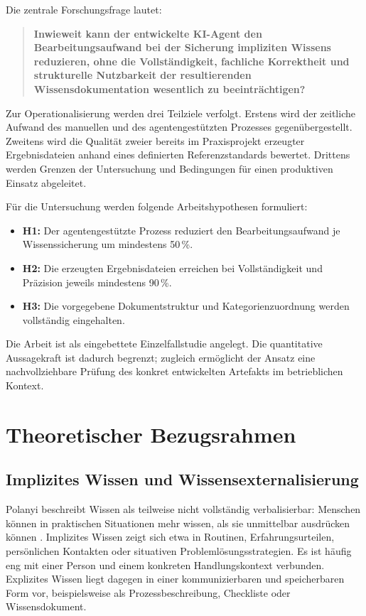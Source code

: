 \documentclass[
  10pt,
  ngerman,
  a4paper,
  toc=graduated,
  numbers=noenddot,
  headings=standardclasses,
  nonumberlist
]{scrartcl}
\newcommand{\pct}[1]{#1\,\%}
\begin{document}
Die zentrale Forschungsfrage lautet:

\begin{quote}
\textbf{Inwieweit kann der entwickelte KI-Agent den Bearbeitungsaufwand bei der Sicherung impliziten Wissens reduzieren, ohne die Vollständigkeit, fachliche Korrektheit und strukturelle Nutzbarkeit der resultierenden Wissensdokumentation wesentlich zu beeinträchtigen?}
\end{quote}

Zur Operationalisierung werden drei Teilziele verfolgt. Erstens wird der zeitliche Aufwand des manuellen und des agentengestützten Prozesses gegenübergestellt. Zweitens wird die Qualität zweier bereits im Praxisprojekt erzeugter Ergebnisdateien anhand eines definierten Referenzstandards bewertet. Drittens werden Grenzen der Untersuchung und Bedingungen für einen produktiven Einsatz abgeleitet.

Für die Untersuchung werden folgende Arbeitshypothesen formuliert:

\begin{itemize}
\item \textbf{H1:} Der agentengestützte Prozess reduziert den Bearbeitungsaufwand je Wissenssicherung um mindestens \pct{50}.
\item \textbf{H2:} Die erzeugten Ergebnisdateien erreichen bei Vollständigkeit und Präzision jeweils mindestens \pct{90}.
\item \textbf{H3:} Die vorgegebene Dokumentstruktur und Kategorienzuordnung werden vollständig eingehalten.
\end{itemize}

Die Arbeit ist als eingebettete Einzelfallstudie angelegt. Die quantitative Aussagekraft ist dadurch begrenzt; zugleich ermöglicht der Ansatz eine nachvollziehbare Prüfung des konkret entwickelten Artefakts im betrieblichen Kontext.

\newpage
\section{Theoretischer Bezugsrahmen}

\subsection{Implizites Wissen und Wissensexternalisierung}

Polanyi beschreibt Wissen als teilweise nicht vollständig verbalisierbar: Menschen können in praktischen Situationen mehr wissen, als sie unmittelbar ausdrücken können \cite{polanyi1966}. Implizites Wissen zeigt sich etwa in Routinen, Erfahrungsurteilen, persönlichen Kontakten oder situativen Problemlösungsstrategien. Es ist häufig eng mit einer Person und einem konkreten Handlungskontext verbunden. Explizites Wissen liegt dagegen in einer kommunizierbaren und speicherbaren Form vor, beispielsweise als Prozessbeschreibung, Checkliste oder Wissensdokument.
\end{document}
